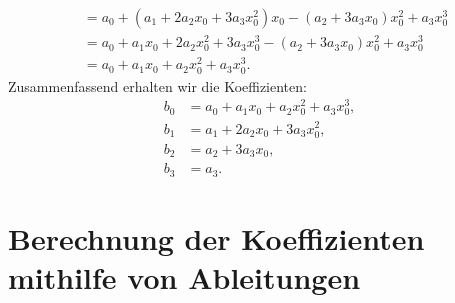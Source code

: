 \begin{mychallenge}
\begin{myanswer}
\begin{align*}
    &= a_0 + (a_1 + 2a_2x_0 + 3a_3x_0^2)x_0 - (a_2 + 3a_3x_0)x_0^2 + a_3x_0^3 \\
    &= a_0 + a_1x_0 + 2a_2x_0^2 + 3a_3x_0^3 - (a_2 + 3a_3x_0)x_0^2 + a_3x_0^3 \\
    &= a_0 + a_1x_0 + a_2x_0^2 + a_3x_0^3.
  \end{align*}
  Zusammenfassend erhalten wir die Koeffizienten:
  \begin{align*}
    b_0 &= a_0 + a_1x_0 + a_2x_0^2 + a_3x_0^3, \\
    b_1 &= a_1 + 2a_2x_0 + 3a_3x_0^2, \\
    b_2 &= a_2 + 3a_3x_0, \\
    b_3 &= a_3.
  \end{align*}
  \end{myanswer}
\end{mychallenge}

\clearpage
\section{Berechnung der Koeffizienten mithilfe von Ableitungen}
